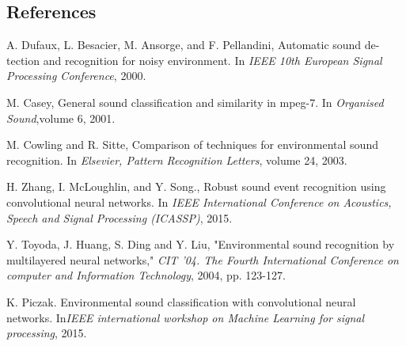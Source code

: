 \documentclass[final]{beamer}
\begin{document}
\begin{frame}[t]
\begin{multicols}{3}

\subsection{References}

\begin{thebibliography}{99}

 A. Dufaux, L. Besacier, M. Ansorge, and F. Pellandini, Automatic sound de-
tection and recognition for noisy environment. In \textit{IEEE 10th European Signal Processing Conference}, 2000.

 M. Casey, General sound classification and similarity in mpeg-7. In \textit{Organised Sound},volume 6, 2001.

 M. Cowling and R. Sitte, Comparison of techniques for environmental sound recognition. In \textit{Elsevier, Pattern Recognition Letters}, volume 24, 2003.

 H. Zhang, I. McLoughlin, and Y. Song., Robust sound event recognition using convolutional neural networks. In \textit{IEEE International Conference on Acoustics, 
Speech and Signal Processing (ICASSP)}, 2015.

 Y. Toyoda, J. Huang, S. Ding and Y. Liu, "Environmental sound recognition by multilayered neural networks," \textit{CIT '04. The Fourth International Conference on computer and Information Technology}, 2004, pp. 123-127.

 K. Piczak. Environmental sound classification with convolutional neural networks. In\textit{IEEE international workshop on Machine Learning for signal processing}, 2015.

\end{thebibliography}

\end{multicols}

\end{frame}
\end{document}
